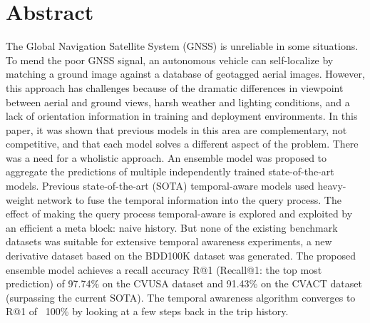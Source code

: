 \documentclass[10pt,letterpaper]{article}
\newif\ifhighlight
\newcommand{\hlb}[1]{\ifhighlight{\hl{#1}}\else{#1}\fi}
\begin{document}
\section*{Abstract}
The Global Navigation Satellite System (GNSS) is unreliable in some situations. To mend the poor GNSS signal, an autonomous vehicle can self-localize by matching a ground image against a database of geotagged aerial images. However, this approach has challenges because of the dramatic differences in viewpoint between aerial and ground views, harsh weather and lighting conditions, and a lack of orientation information in training and deployment environments. In this paper, \hlb{it was shown that previous models in} this area are complementary, not competitive, and that each model solves a different aspect of the problem. \hlb{There was a need for a wholistic approach.} \hlb{An ensemble model was proposed} to aggregate the predictions of multiple independently trained state-of-the-art models. \hlb{Previous state-of-the-art (SOTA) temporal-aware models  used heavy-weight network to fuse the temporal information into the query process. The effect of making the query process temporal-aware is explored and exploited by an efficient a meta block: naive history}. But none of the existing benchmark datasets \hlb{was} suitable for extensive temporal awareness experiments, \hlb{a new derivative dataset based on the BDD100K dataset was generated}. \hlb{The proposed ensemble model achieves} a recall accuracy R@1 \hlb{(Recall@1: the top most prediction)} of 97.74\% on the CVUSA dataset and 91.43\% on the CVACT dataset (surpassing the current \hlb{SOTA}). The  temporal awareness algorithm converges to R@1 of ~100\% by looking at a few steps back in the trip history.

\linenumbers

\end{document}
